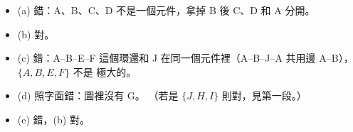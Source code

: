\begin{pastsoln}
\begin{itemize}
\item (a) 錯：A、B、C、D 不是一個元件，拿掉 B 後 C、D 和 A 分開。
\item (b) 對。
\item (c) 錯：A--B--E--F 這個環還和 J 在同一個元件裡（A--B--J--A 共用邊 A--B），$\{A, B, E, F\}$ 不是
極大的。
\item (d) 照字面錯：圖裡沒有 G。 （若是 $\{J, H, I\}$ 則對，見第一段。）
\item (e) 錯，(b) 對。
\end{itemize}
\end{pastsoln}
